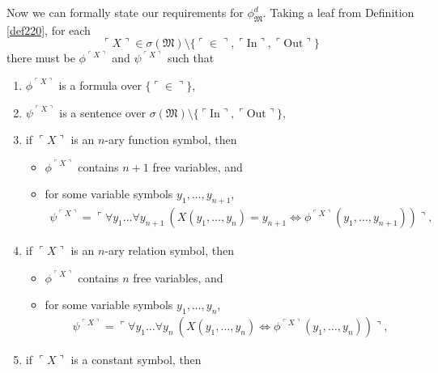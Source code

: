 \documentclass[12pt, twoside]{memoir}
\numberwithin{equation}{section}
\theoremstyle{definition}
\theoremstyle{remark}
\theoremstyle{definition}
\theoremstyle{definition}
\theoremstyle{definition}
\theoremstyle{remark}
\begin{document}
Now we can formally state our requirements for $\phi^d_{\mathfrak{M}}$. Taking a leaf from Definition \ref{def220}, for each 
\begin{equation*}
    \ulcorner X \urcorner \in \sigma(\mathfrak{M}) \setminus \{\ulcorner \in \urcorner, \ulcorner \mathrm{In} \urcorner, \ulcorner \mathrm{Out} \urcorner\}
\end{equation*} there must be $\phi^{\ulcorner X \urcorner}$ and $\psi^{\ulcorner X \urcorner}$ such that
\begin{enumerate}[label=(\alph*)]
    \item $\phi^{\ulcorner X \urcorner}$ is a formula over $\{\ulcorner \in \urcorner\}$,
    \item $\psi^{\ulcorner X \urcorner}$ is a sentence over $\sigma(\mathfrak{M}) \setminus \{\ulcorner \mathrm{In} \urcorner, \ulcorner \mathrm{Out} \urcorner\}$,
    \item if $\ulcorner X \urcorner$ is an $n$-ary function symbol, then 
    \begin{itemize}[label=$\circ$, leftmargin=20pt]
        \item $\phi^{\ulcorner X \urcorner}$ contains $n + 1$ free variables, and
        \item for some variable symbols $y_1, \dots, y_{n+1}$,
        \begin{align*}
            \psi^{\ulcorner X \urcorner} = \ulcorner \forall y_1 \dots \forall y_{n+1} \ (X(y_1, \dots, y_n) = y_{n+1} \iff \phi^{\ulcorner X \urcorner}(y_1, \dots, y_{n+1})) \urcorner \text{,}
        \end{align*}
    \end{itemize}
    \item if $\ulcorner X \urcorner$ is an $n$-ary relation symbol, then 
    \begin{itemize}[label=$\circ$, leftmargin=20pt]
        \item $\phi^{\ulcorner X \urcorner}$ contains $n$ free variables, and
        \item for some variable symbols $y_1, \dots, y_n$,
        \begin{align*}
            \psi^{\ulcorner X \urcorner} = \ulcorner \forall y_1 \dots \forall y_n \ (X(y_1, \dots, y_n) \iff \phi^{\ulcorner X \urcorner}(y_1, \dots, y_n)) \urcorner \text{,}
        \end{align*}
    \end{itemize}
    \item if $\ulcorner X \urcorner$ is a constant symbol, then 
    \begin{itemize}[label=$\circ$, leftmargin=20pt]

\end{itemize}
\end{enumerate}
\end{document}

